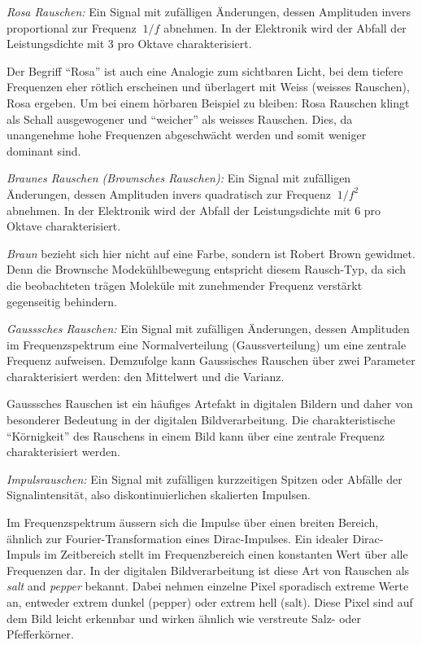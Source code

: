 \begin{definition}
	{\em Rosa Rauschen:}
	Ein Signal mit zufälligen Änderungen, dessen Amplituden invers proportional zur Frequenz $ ~1/f $  abnehmen. In der Elektronik wird der Abfall der Leistungsdichte mit 3  pro Oktave charakterisiert.
\end{definition}

 Der Begriff ``Rosa'' ist auch eine Analogie zum sichtbaren Licht, bei dem tiefere Frequenzen eher rötlich erscheinen und überlagert mit Weiss (weisses Rauschen), Rosa ergeben. Um bei einem hörbaren Beispiel zu bleiben: Rosa Rauschen klingt als Schall ausgewogener und ``weicher'' als weisses Rauschen. Dies, da unangenehme hohe Frequenzen abgeschwächt werden und somit weniger dominant sind.

\begin{definition}
	{\em Braunes Rauschen (Brownsches Rauschen):}
	Ein Signal mit zufälligen Änderungen, dessen Amplituden invers quadratisch zur Frequenz $ ~1/f^2 $ abnehmen. In der Elektronik wird der Abfall der Leistungsdichte mit 6  pro Oktave charakterisiert.
\end{definition}

\textit{Braun} bezieht sich hier nicht auf eine Farbe, sondern ist Robert Brown gewidmet. Denn die Brownsche Modekühlbewegung entspricht diesem Rausch-Typ, da sich die beobachteten trägen Moleküle mit zunehmender Frequenz verstärkt gegenseitig behindern.

\begin{definition}
	{\em Gausssches Rauschen:}
	Ein Signal mit zufälligen Änderungen, dessen Amplituden im Frequenzspektrum eine Normalverteilung (Gaussverteilung) um eine zentrale Frequenz aufweisen. Demzufolge kann Gaussisches Rauschen über zwei Parameter charakterisiert werden: den Mittelwert und die Varianz.
\end{definition}

Gausssches Rauschen ist ein häufiges Artefakt in digitalen Bildern und daher von besonderer Bedeutung in der digitalen Bildverarbeitung. Die charakteristische ``Körnigkeit'' des Rauschens in einem Bild kann über eine zentrale Frequenz charakterisiert werden.

\begin{definition}
	{\em Impulsrauschen:}
	Ein Signal mit zufälligen kurzzeitigen Spitzen oder Abfälle der Signalintensität, also diskontinuierlichen skalierten Impulsen. 
\end{definition}

Im Frequenzspektrum äussern sich die Impulse über einen breiten Bereich, ähnlich zur Fourier-Transformation eines Dirac-Impulses. Ein idealer Dirac-Impuls im Zeitbereich stellt im Frequenzbereich einen konstanten Wert über alle Frequenzen dar.
In der digitalen Bildverarbeitung ist diese Art von Rauschen als \textit{salt} and \textit{pepper} bekannt. Dabei nehmen einzelne Pixel sporadisch extreme Werte an, entweder extrem dunkel (pepper) oder extrem hell (salt). Diese Pixel sind auf dem Bild leicht erkennbar und wirken ähnlich wie verstreute Salz- oder Pfefferkörner.


